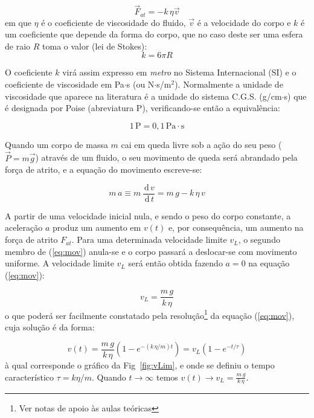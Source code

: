 \documentclass[a4paper,twoside,11pt]{report}      %
\newcommand{\ud}{\,\mathrm{d}}
\begin{document}
\begin{equation}
	\label{eq:f_atrito}
	\vec{F}_{at} = - k \, \eta \vec{v}
\end{equation}
em que $\eta$ é o coeficiente de viscosidade do fluido, $\vec{v}$ é a velocidade do corpo e $k$ é um coeficiente que depende da forma do corpo, que no caso deste ser uma esfera de raio $R$ toma o valor (lei de Stokes): 
\begin{equation}
	\label{eq:coef_atrito}
	k = 6 \pi R
\end{equation}


O coeficiente $k$ virá assim expresso em \emph{metro} no Sistema Internacional (SI) e o coeficiente de viscosidade em Pa$\cdot$s (ou N$\cdot$s/m$^2$).
Normalmente a unidade de viscosidade que aparece na literatura é a unidade do sistema C.G.S. (g/cm$\cdot$s) que é designada por Poise (abreviatura P), verificando-se então a equivalência:

\begin{equation*}
	1 \, \mathrm{P} = 0,1\, \mathrm{Pa}\cdot\mathrm{s}
\end{equation*}

Quando um corpo de massa $m$ cai em queda livre sob a ação do seu peso ($\vec{P}=m\vec{g}$) através de um fluido, o seu movimento de queda será abrandado pela força de atrito, e a equação do movimento escreve-se:

\begin{equation}
	\label{eq:mov}
	m\,a \equiv m\, \frac{\ud\, v}{\ud\, t} =  m\,g - k  \, \eta \, v
\end{equation}

A partir de uma velocidade inicial nula, e sendo o peso do corpo constante, a aceleração $a$ produz um aumento  em $v(t)$ e, por consequência, um aumento na força de atrito $F_{at}$. Para uma determinada velocidade limite $v_L$, o segundo membro de (\ref{eq:mov}) anula-se e o corpo passará a deslocar-se com movimento uniforme. A velocidade limite $v_L$ será então obtida fazendo $a= 0$ na equação (\ref{eq:mov}):

\begin{equation}
	\label{eq:vlimit}
	v_L = \frac{m\,g}{k  \, \eta}
\end{equation}
o que poderá ser facilmente constatado pela resolução\footnote{Ver notas de apoio às aulas teóricas} da equação (\ref{eq:mov}), cuja solução é da forma:

\begin{equation}
	\label{eq:vlimita}
	v(t) = \frac{m\,g}{k  \, \eta} (1 - e^{- (k\,\eta / m) t}) = v_L (1-e^{-t/\tau})
\end{equation}
à qual corresponde o gráfico  da Fig~\ref{fig:vLim}, e onde se definiu o tempo característico $\tau=k\eta/m$. Quando $t \to \infty$ temos $v(t) \to v_L = \frac{m\,g}{k  \, \eta} $.
\end{document}
